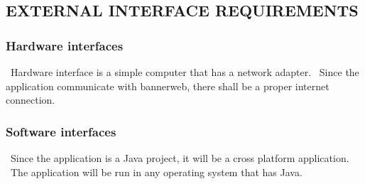 \documentclass[twoside,letterpaper]{article}
\begin{document}
\subsection[EXTERNAL INTERFACE
REQUIREMENTS]{\rmfamily\bfseries\color{black}
EXTERNAL INTERFACE REQUIREMENTS}

\subsubsection[Hardware
interfaces]{\rmfamily\bfseries\color{black}
Hardware interfaces}
{\color{black}
\foreignlanguage{english}{\ }\foreignlanguage{english}{Hardware interface is a simple computer that has a network adapter. \ Since the application communicate with bannerweb, there shall be a proper internet connection.}}

\subsubsection[Software
interfaces]{\rmfamily\bfseries\color{black}
Software interfaces}
{\color{black}
\foreignlanguage{english}{\ }\foreignlanguage{english}{Since the application is a Java project, it will be a cross platform application. \ The application will be run in any operating system that has Java.}}
\end{document}
